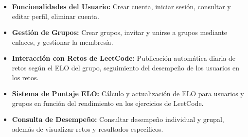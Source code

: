\begin{itemize}
    \item \textbf{Funcionalidades del Usuario:} Crear cuenta, iniciar sesión, consultar y editar perfil, eliminar cuenta.
    \item \textbf{Gestión de Grupos:} Crear grupos, invitar y unirse a grupos mediante enlaces, y gestionar la membresía.
    \item \textbf{Interacción con Retos de LeetCode:} Publicación automática diaria de retos según el ELO del grupo, seguimiento del desempeño de los usuarios en los retos.
    \item \textbf{Sistema de Puntaje ELO:} Cálculo y actualización de ELO para usuarios y grupos en función del rendimiento en los ejercicios de LeetCode.
    \item \textbf{Consulta de Desempeño:} Consultar desempeño individual y grupal, además de visualizar retos y resultados específicos.
\end{itemize}
